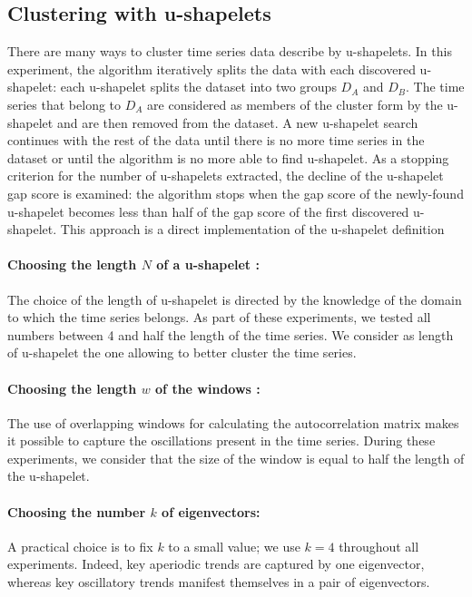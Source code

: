 \subsection{Clustering with u-shapelets}
There are many ways to cluster time series data describe by u-shapelets. In this experiment, the algorithm iteratively splits the data with each discovered u-shapelet: each u-shapelet splits the dataset into two groups $D_A$ and $D_B$. The time series that belong to $D_A$ are considered as members of the cluster form by the u-shapelet and are then removed from the dataset. A new u-shapelet search continues with the rest of the data until there is no more time series in the dataset or until the algorithm is no more able to find u-shapelet. As a stopping criterion for the number of u-shapelets extracted, the decline of the u-shapelet gap score is examined: the algorithm stops when the gap score of the newly-found u-shapelet becomes less than half of the gap score of the first discovered u- shapelet. This approach is a direct implementation of the u-shapelet definition

\paragraph{Choosing the length $N$ of a u-shapelet : }
The choice of the length of u-shapelet is directed by the knowledge of the
domain to which the time series belongs. As part of these experiments, we tested all  numbers between 4 and half the length of the time series. We consider as length of u-shapelet the one allowing to better cluster the time series.

\paragraph{Choosing the length $w$ of the windows : }
The use of overlapping windows for calculating the autocorrelation matrix makes
it possible to capture the oscillations present in the time series. During these experiments, we consider that the size of the window is equal to half the length of the u-shapelet.
  
\paragraph{Choosing  the number $k$ of eigenvectors: }
A practical choice is to fix $k$ to a small value; we use $k = 4$ throughout all
experiments. Indeed, key aperiodic trends are captured by one eigenvector,
whereas key oscillatory trends manifest themselves in a pair of eigenvectors.  

